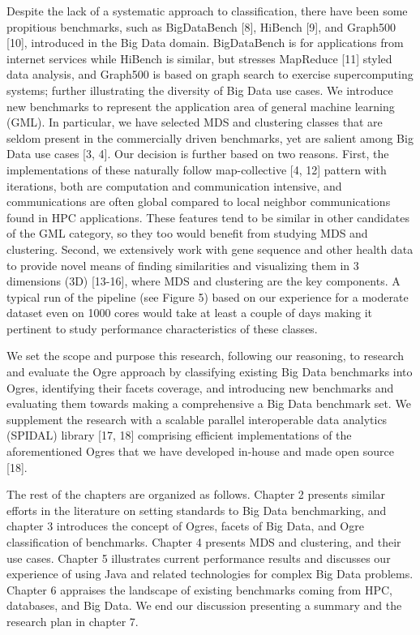 Despite the lack of a systematic approach to classification, there have been some propitious benchmarks, such as  BigDataBench [8], HiBench [9], and Graph500 [10], introduced in the Big Data domain. BigDataBench is for applications from internet services while HiBench is similar, but stresses MapReduce [11] styled data analysis, and Graph500 is based on graph search to exercise supercomputing systems; further illustrating the diversity of Big Data use cases. We introduce new benchmarks to represent the application area of general machine learning (GML). In particular, we have selected MDS and clustering classes that are seldom present in the commercially driven benchmarks, yet are salient among Big Data use cases [3, 4]. Our decision is further based on two reasons. First, the implementations of these naturally follow map-collective [4, 12] pattern with iterations, both are computation and communication intensive, and communications are often global compared to local neighbor communications found in HPC applications. These features tend to be similar in other candidates of the GML category, so they too would benefit from studying MDS and clustering. Second, we extensively work with gene sequence and other health data to provide novel means of finding similarities and visualizing them in 3 dimensions (3D) [13-16], where MDS and clustering are the key components. A typical run of the pipeline (see Figure 5) based on our experience for a moderate dataset even on 1000 cores would take at least a couple of days making it pertinent to study performance characteristics of these classes. 

We set the scope and purpose this research, following our reasoning, to research and evaluate the Ogre approach by classifying existing Big Data benchmarks into Ogres, identifying their facets coverage, and introducing new benchmarks and evaluating them towards making a comprehensive a Big Data benchmark set. We supplement the research with a scalable parallel interoperable data analytics (SPIDAL) library [17, 18] comprising efficient implementations of the aforementioned Ogres that we have developed in-house and made open source [18].

The rest of the chapters are organized as follows. Chapter 2 presents similar efforts in the literature on setting standards to Big Data benchmarking, and chapter 3 introduces the concept of Ogres, facets of Big Data, and Ogre classification of benchmarks. Chapter 4 presents MDS and clustering, and their use cases. Chapter 5 illustrates current performance results and discusses our experience of using Java and related technologies for complex Big Data problems. Chapter 6 appraises the landscape of existing benchmarks coming from HPC, databases, and Big Data. We end our discussion presenting a summary and the research plan in chapter 7.

\vspace{1em}
